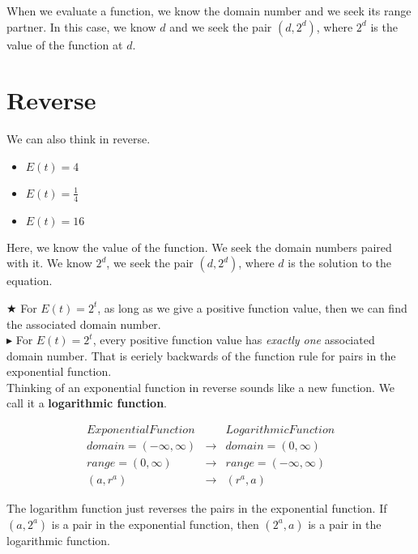 \documentclass{ximera}
\begin{document}
When we evaluate a function, we know the domain number and we seek its range partner. In this case, we know $d$ and we seek the pair $(d, 2^d)$, where $2^d$ is the value of the function at $d$.





\section{Reverse}

We can also think in reverse.
\begin{itemize}
\item $E(t) = 4$
\item $E(t) = {\tfrac{1}{4}} $
\item $E(t) = 16 $
\end{itemize}


Here, we know the value of the function.  We seek the domain numbers paired with it. We know $2^d$, we seek the pair $(d, 2^d)$, where $d$ is the solution to the equation.




$\bigstar$ For $E(t) = 2^t$, as long as we give a positive function value, then we can find the associated domain number. \\ 



$\blacktriangleright$ For $E(t) = 2^t$, every positive function value has \textit{exactly one} associated domain number. That is eeriely backwards of the function rule for pairs in the exponential function.\\ 




Thinking of an exponential function in reverse sounds like a new function. We call it a \textbf{logarithmic function}.






\[
\begin{array}{lcl}
Exponential Function  &     &  Logarithmic Function  \\
domain = (-\infty, \infty)  &  \longrightarrow  &  domain = (0, \infty)  \\
range = (0, \infty)  &  \longrightarrow  &  range = (-\infty, \infty)  \\
(a, r^a)    &  \longrightarrow  &   (r^a, a)
\end{array}
\]


The logarithm function just reverses the pairs in the exponential function.  If $(a, 2^a)$ is a pair in the exponential function, then $(2^a, a)$ is a pair in the logarithmic function.
\end{document}
